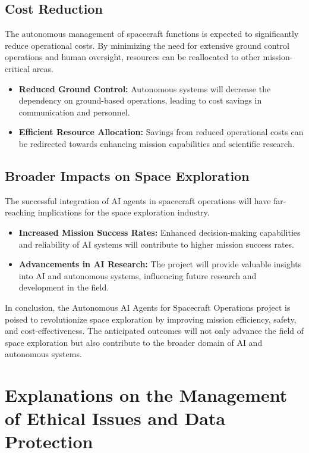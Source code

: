 \documentclass[a4paper, 11pt]{article}
\begin{document}
\subsection{Cost Reduction}

The autonomous management of spacecraft functions is expected to significantly reduce operational costs. By minimizing the need for extensive ground control operations and human oversight, resources can be reallocated to other mission-critical areas.

\begin{itemize}
    \item \textbf{Reduced Ground Control:} Autonomous systems will decrease the dependency on ground-based operations, leading to cost savings in communication and personnel.
    \item \textbf{Efficient Resource Allocation:} Savings from reduced operational costs can be redirected towards enhancing mission capabilities and scientific research.
\end{itemize}

\subsection{Broader Impacts on Space Exploration}

The successful integration of AI agents in spacecraft operations will have far-reaching implications for the space exploration industry. 

\begin{itemize}
    \item \textbf{Increased Mission Success Rates:} Enhanced decision-making capabilities and reliability of AI systems will contribute to higher mission success rates.
    \item \textbf{Advancements in AI Research:} The project will provide valuable insights into AI and autonomous systems, influencing future research and development in the field.
\end{itemize}

In conclusion, the Autonomous AI Agents for Spacecraft Operations project is poised to revolutionize space exploration by improving mission efficiency, safety, and cost-effectiveness. The anticipated outcomes will not only advance the field of space exploration but also contribute to the broader domain of AI and autonomous systems.
\section{Explanations on the Management of Ethical Issues and Data Protection}
\end{document}

